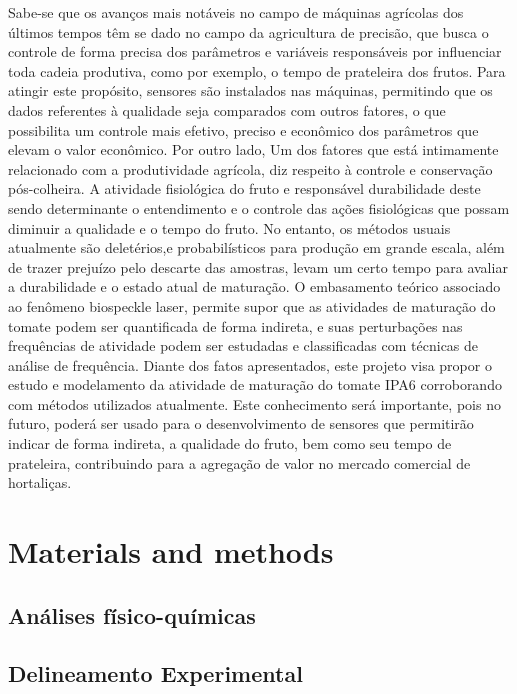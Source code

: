 \documentclass{elsarticle}
\begin{document}
Sabe-se que os avanços mais notáveis no campo de máquinas agrícolas dos últimos tempos têm se dado no campo da agricultura de precisão, que busca o controle de forma precisa dos parâmetros e variáveis responsáveis por influenciar toda cadeia produtiva, como por exemplo, o tempo de prateleira dos frutos. Para atingir este propósito, sensores são instalados nas máquinas, permitindo que os dados referentes à qualidade seja comparados com outros fatores, o que possibilita um controle mais efetivo, preciso e econômico dos parâmetros que elevam o valor econômico. Por outro lado, Um dos fatores que está intimamente relacionado com a produtividade agrícola, diz respeito à controle e conservação pós-colheira. A atividade fisiológica do fruto e responsável durabilidade deste sendo determinante o entendimento e o controle das ações fisiológicas que possam diminuir a qualidade e o tempo do fruto. No entanto, os métodos usuais atualmente são deletérios,e probabilísticos para produção em grande escala, além de trazer prejuízo pelo descarte das amostras, levam um certo tempo para avaliar a durabilidade e o estado atual de maturação. O embasamento teórico associado ao fenômeno biospeckle laser, permite supor que as atividades de maturação do tomate podem ser quantificada de forma indireta, e suas perturbações nas frequências de atividade podem ser estudadas e classificadas com técnicas de análise de frequência.
Diante dos fatos apresentados, este projeto visa propor o estudo e modelamento da atividade de maturação do tomate IPA6 corroborando com métodos utilizados atualmente. Este conhecimento será importante, pois no futuro, poderá ser usado para o desenvolvimento de sensores que permitirão indicar de forma indireta, a qualidade do fruto, bem como seu tempo de prateleira, contribuindo para a agregação de valor no mercado comercial de hortaliças. 



\section{Materials and methods}

\subsection{Análises físico-químicas} 



\subsection{Delineamento Experimental}
\end{document}
